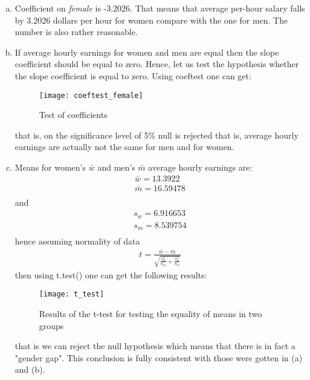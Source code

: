 \documentclass[a4paper]{article}
\begin{document}
\begin{enumerate}[a.]
	\item Coefficient on \textit{female} is -3.2026. That means that average per-hour salary falls by 3.2026 dollars per hour for women compare with the one for men. The number is also rather reasonable.
	\item If average hourly earnings for women and men are equal then the slope coefficient should be equal to zero. Hence, let us test the hypothesis whether the slope coefficient is equal to zero. Using coeftest one can get:
	
	
	\begin{figure}[H]
		\centering
		\texttt{[image: coeftest\_female]}
		\caption{Test of coefficients}
	\end{figure}

	that is, on the significance level of 5\% null is rejected that is, average hourly earnings are actually not the same for men and for women.
	\item Means for women's $\bar{w}$ and men's $\bar{m}$ average hourly earnings are:
	\begin{align*}
	\bar{w} = 13.3922\\
	\bar{m} = 16.59478\\
	\end{align*}
	and
	\begin{align*}
	s_w = 6.916653\\
	s_m = 8.539754\\
	\end{align*}
	hence assuming normality of data
	\begin{align*}
	t = \frac{\bar{w} - \bar{m}}{\sqrt{\frac{s_m^2}{n_m} + \frac{s_w^2}{n_w}}}
	\end{align*}
	then using t.test() one can get the following results:
		\begin{figure}[H]
		\centering
		\texttt{[image: t\_test]}
		\caption{Results of the t-test for testing the equality of means in two groups}
	\end{figure}
that is we can reject the null hypothesis which means that there is in fact a "gender gap". This conclusion is fully consistent with those were gotten in (a) and (b).
\end{enumerate}
\end{document}
